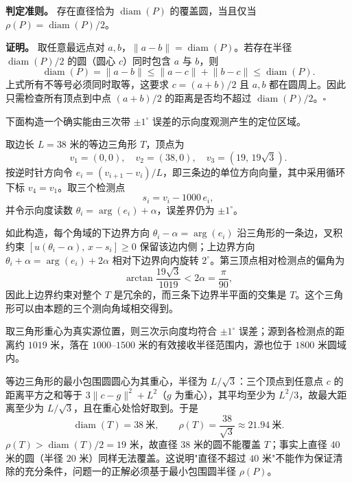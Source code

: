 \documentclass[UTF8,a4paper,zihao=-4,fontset=none]{ctexart}
\begin{document}
\textbf{判定准则。} 存在直径恰为 \(\operatorname{diam}(P)\) 的覆盖圆，当且仅当 \(\rho(P)=\operatorname{diam}(P)/2\)。

\textbf{证明。} 取任意最远点对 \(a,b\)，\(\lVert a-b\rVert=\operatorname{diam}(P)\)。若存在半径 \(\operatorname{diam}(P)/2\) 的圆（圆心 \(c\)）同时包含 \(a\) 与 \(b\)，则
\begin{equation}
  \operatorname{diam}(P)=\lVert a-b\rVert\le\lVert a-c\rVert+\lVert b-c\rVert\le\operatorname{diam}(P) .
\end{equation}
上式所有不等号必须同时取等，这要求 \(c=(a+b)/2\) 且 \(a,b\) 都在圆周上。因此只需检查所有顶点到中点 \((a+b)/2\) 的距离是否均不超过 \(\operatorname{diam}(P)/2\)。\(\square\)

下面构造一个确实能由三次带 \(\pm1^\circ\) 误差的示向度观测产生的定位区域。

取边长 \(L=38\) 米的等边三角形 \(T\)，顶点为
\begin{equation}
  v_1=(0,0),\quad v_2=(38,0),\quad v_3=(19,\,19\sqrt3).
  \label{eq:triangle}
\end{equation}
按逆时针方向令 \(e_i=(v_{i+1}-v_i)/L\)，即三条边的单位方向向量，其中采用循环下标 \(v_4=v_1\)。取三个检测点
\begin{equation}
  s_i=v_i-1000\,e_i,
\end{equation}
并令示向度读数 \(\theta_i=\arg(e_i)+\alpha\)，误差界仍为 \(\pm1^\circ\)。

如此构造，每个角域的下边界方向 \(\theta_i-\alpha=\arg(e_i)\) 沿三角形的一条边，叉积约束 \([u(\theta_i-\alpha),\,x-s_i]\ge0\) 保留该边内侧；上边界方向 \(\theta_i+\alpha=\arg(e_i)+2\alpha\) 相对下边界向内旋转 \(2^\circ\)。第三顶点相对检测点的偏角为
\begin{equation}
  \arctan\frac{19\sqrt3}{1019}<2\alpha=\frac{\pi}{90},
\end{equation}
因此上边界约束对整个 \(T\) 是冗余的，而三条下边界半平面的交集是 \(T\)。这个三角形可以由本题的三个测向角域相交得到。

取三角形重心为真实源位置，则三次示向度均符合 \(\pm1^\circ\) 误差；源到各检测点的距离约 \(1019\) 米，落在 \(1000\)--\(1500\) 米的有效接收半径范围内，源也位于 \(1800\) 米圆域内。

等边三角形的最小包围圆圆心为其重心，半径为 \(L/\sqrt3\)：三个顶点到任意点 \(c\) 的距离平方之和等于 \(3\lVert c-g\rVert^2+L^2\)（\(g\) 为重心），其平均至少为 \(L^2/3\)，故最大距离至少为 \(L/\sqrt3\)，且在重心处恰好取到。于是
\begin{equation}
  \operatorname{diam}(T)=38\ \text{米},\qquad \rho(T)=\frac{38}{\sqrt3}\approx21.94\ \text{米}.
  \label{eq:counterexample}
\end{equation}
\(\rho(T)>\operatorname{diam}(T)/2=19\) 米，故直径 \(38\) 米的圆不能覆盖 \(T\)；事实上直径 \(40\) 米的圆（半径 \(20\) 米）同样无法覆盖。这说明"直径不超过 \(40\) 米"不能作为保证清除的充分条件，问题一的正解必须基于最小包围圆半径 \(\rho(P)\)。
\end{document}
